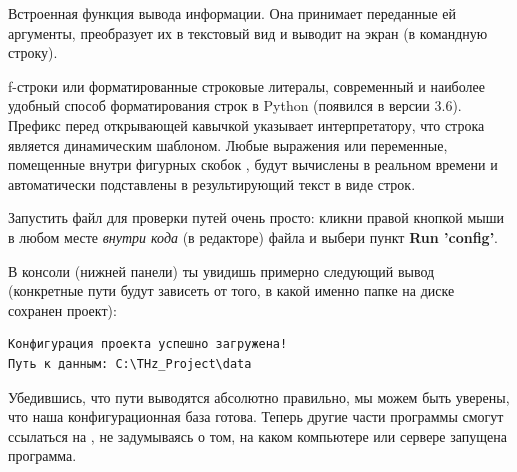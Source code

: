 \begin{syntaxdesc}
    \item[Функция вывода (строки 9--10) \mycode{print()}] Встроенная функция вывода информации. Она принимает переданные ей аргументы, преобразует их в текстовый вид и выводит на экран (в командную строку).
    \item[Форматированный литерал (строки 9--10) \mycode{f"..."}] f-строки или форматированные строковые литералы, современный и наиболее удобный способ форматирования строк в Python (появился в версии 3.6). Префикс  перед открывающей кавычкой указывает интерпретатору, что строка является динамическим шаблоном. Любые выражения или переменные, помещенные внутри фигурных скобок \mycode{{}}, будут вычислены в реальном времени и автоматически подставлены в результирующий текст в виде строк.
\end{syntaxdesc}


Запустить файл  для проверки путей очень просто: кликни правой кнопкой мыши в любом месте \textit{внутри кода} (в редакторе) файла  и выбери пункт \textbf{Run 'config'}.

В консоли (нижней панели) ты увидишь примерно следующий вывод (конкретные пути будут зависеть от того, в какой именно папке на диске сохранен проект):
\begin{verbatim}
Конфигурация проекта успешно загружена!
Путь к данным: C:\THz_Project\data
\end{verbatim}

Убедившись, что пути выводятся абсолютно правильно, мы можем быть уверены, что наша конфигурационная база готова. Теперь другие части программы смогут ссылаться на , не задумываясь о том, на каком компьютере или сервере запущена программа.

